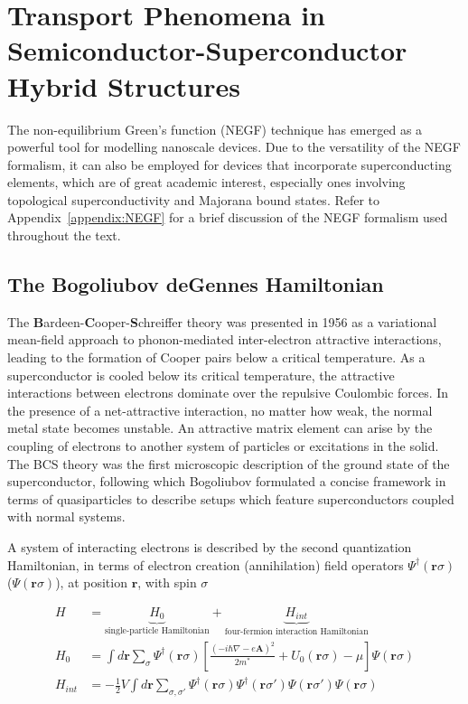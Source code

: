\chapter{Transport Phenomena in Semiconductor-Superconductor Hybrid Structures}

The non-equilibrium Green's function (NEGF) technique has emerged as a powerful tool for modelling nanoscale devices. Due to the versatility of the NEGF formalism, it can also be employed for devices that incorporate superconducting elements, which are of great academic interest, especially ones involving topological superconductivity and Majorana bound states. Refer to Appendix~\ref{appendix:NEGF} for a brief discussion of the NEGF formalism used throughout the text. \par 

\section{The Bogoliubov deGennes Hamiltonian}

The {\bf B}ardeen-{\bf C}ooper-{\bf S}chreiffer theory was presented in 1956 as a variational mean-field approach to phonon-mediated inter-electron attractive interactions, leading to the formation of Cooper pairs below a critical temperature. As a superconductor is cooled below its critical temperature, the attractive interactions between electrons dominate over the repulsive Coulombic forces. In the presence of a net-attractive interaction, no matter how weak, the normal metal state becomes unstable. An attractive matrix element can arise by the coupling of electrons to another system of particles or excitations in the solid. The BCS theory was the first microscopic description of the ground state of the superconductor, following which Bogoliubov formulated a concise framework in terms of quasiparticles to describe setups which feature superconductors coupled with normal systems. \par 

A system of interacting electrons is described by the second quantization Hamiltonian, in terms of electron creation (annihilation) field operators $\Psi^{\dagger}(\textbf{r}\sigma)$ ($\Psi(\textbf{r}\sigma)$), at position $\textbf{r}$, with spin $\sigma$

\begin{equation}
        \begin{aligned}
        H &= \underbrace{H_{0}}_{\text{single-particle Hamiltonian}} +\underbrace{H_{int}}_{\text{four-fermion interaction Hamiltonian}} \\
        H_{0} &= \int d\textbf{r} \sum_{\sigma} \Psi^{\dagger}(\textbf{r}\sigma) \left[ \frac{(-i\hbar \nabla - e \textbf{A})^{2}}{2m^{*}} + U_{0}(\textbf{r}\sigma) - \mu \right] \Psi(\textbf{r}\sigma) \\
        H_{int} &= -\frac{1}{2}V \int d\textbf{r} \sum_{\sigma, \sigma'} \Psi^{\dagger}(\textbf{r}\sigma) \Psi^{\dagger}(\textbf{r}\sigma') \Psi(\textbf{r}\sigma') \Psi(\textbf{r}\sigma)
        \end{aligned}
\end{equation}
 
